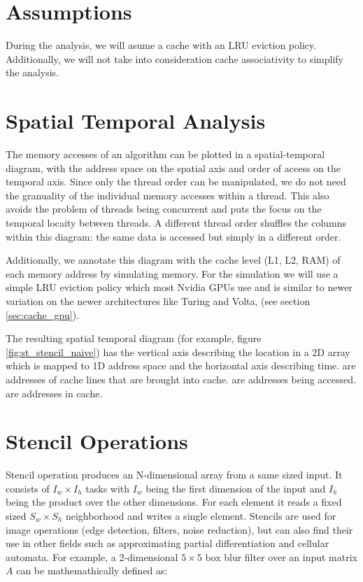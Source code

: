 \section{Assumptions}
During the analysis, we will asume a cache with an LRU eviction policy.
Additionally, we will not take into consideration cache associativity to simplify the analysis.

\section{Spatial Temporal Analysis}
\label{sec:st_analysis}
The memory accesses of an algorithm can be plotted in a spatial-temporal diagram, with the address space on the spatial axis and order of access on the temporal axis.
Since only the thread order can be manipulated, we do not need the granuality of the individual memory accesses within a thread.
This also avoids the problem of threads being concurrent and puts the focus on the temporal locaity between threads.
A different thread order shuffles the columns within this diagram: the same data is accessed but simply in a different order.

Additionally, we annotate this diagram with the cache level (L1, L2, RAM) of each memory address by simulating memory.
For the simulation we will use a simple LRU eviction policy which most Nvidia GPUs use and is similar to newer variation on the newer architectures like Turing and Volta, (see section \ref{sec:cache_gpu}).

The resulting spatial temporal diagram (for example, figure \ref{fig:st_stencil_naive}) has the vertical axis describing the location in a 2D array which is mapped to 1D address space and the horizontal axis describing time.  are addresses of cache lines that are brought into cache.  are addresses being accessed.  are addresses in cache.

\section{Stencil Operations}

Stencil operation produces an N-dimensional array from a same sized input.
It consists of $I_w \times I_h$ tasks with $I_w$ being the first dimension of the input and $I_h$ being the product over the other dimensions.
For each element it reads a fixed sized $S_w \times S_h$ neighborhood and writes a single element.
Stencils are used for image operations (edge detection, filters, noise reduction), but can also find their use in other fields such as approximating partial differentiation\cite{roth1997compilingstencils} and cellular automata.
For example, a 2-dimensional $5 \times 5$ box blur filter over an input matrix $A$ can be mathemathically defined as:

